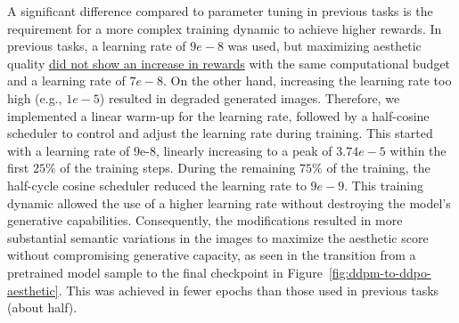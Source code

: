 \noindent A significant difference compared to parameter tuning in previous tasks is the requirement for a more complex training dynamic to achieve higher rewards. In previous tasks, a learning rate of $9e-8$ was used, but maximizing aesthetic quality \href{https://wandb.ai/alcazar90/ddpo-aesthetic-ddpm-celebahq256/runs/omta8esy}{did not show an increase in rewards} with the same computational budget and a learning rate of $7e-8$. On the other hand, increasing the learning rate too high (e.g., \href{https://wandb.ai/alcazar90/ddpo-aesthetic-ddpm-celebahq256/runs/3lb094dk}{$1e-5$}) resulted in degraded generated images. Therefore, we implemented a linear warm-up for the learning rate, followed by a half-cosine scheduler to control and adjust the learning rate during training. This started with a learning rate of 9e-8, linearly increasing to a peak of $3.74e-5$ within the first $25\%$ of the training steps. During the remaining $75\%$ of the training, the half-cycle cosine scheduler reduced the learning rate to $9e-9$. This training dynamic allowed the use of a higher learning rate without destroying the model's generative capabilities. Consequently, the modifications resulted in more substantial semantic variations in the images to maximize the aesthetic score without compromising generative capacity, as seen in the transition from a pretrained model sample to the final checkpoint in Figure~\ref{fig:ddpm-to-ddpo-aesthetic}. This was achieved in fewer epochs than those used in previous tasks (about half). \\

